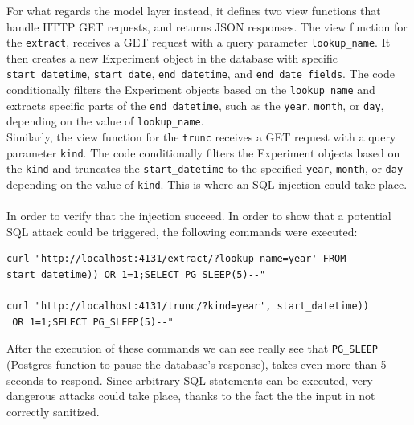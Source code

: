 \documentclass{article}
\begin{document}
	For what regards the model layer instead, it defines two view functions that handle HTTP GET requests, and returns JSON responses. The view function for the \verb|extract|, receives a GET request with a query parameter \verb|lookup_name|. It then creates a new Experiment object in the database with specific \verb|start_datetime|, \verb|start_date|, \verb|end_datetime|, and \verb|end_date fields|. The code conditionally filters the Experiment objects based on the \verb|lookup_name| and extracts specific parts of the \verb|end_datetime|, such as the \verb|year|, \verb|month|, or \verb|day|, depending on the value of \verb|lookup_name|. \\ 
	Similarly, the view function for the \verb|trunc| receives a GET request with a query parameter \verb|kind|. The code conditionally filters the Experiment objects based on the \verb|kind| and truncates the \verb|start_datetime| to the specified \verb|year|, \verb|month|, or \verb|day| depending on the value of \verb|kind|. This is where an SQL injection could take place. \\ \\
	In order to verify that the injection succeed. In order to show that a potential SQL attack could be triggered, the following commands were executed:
	\begin{lstlisting}[style=Bash]
curl "http://localhost:4131/extract/?lookup_name=year' FROM 
start_datetime)) OR 1=1;SELECT PG_SLEEP(5)--" 

curl "http://localhost:4131/trunc/?kind=year', start_datetime))
 OR 1=1;SELECT PG_SLEEP(5)--"
	\end{lstlisting}
	After the execution of these commands we can see really see that \verb|PG_SLEEP| (Postgres function to pause the database's response), takes even more than 5 seconds to respond. Since arbitrary SQL statements can be executed, very dangerous attacks could take place, thanks to the fact the the input in not correctly sanitized.
	
\end{document}

